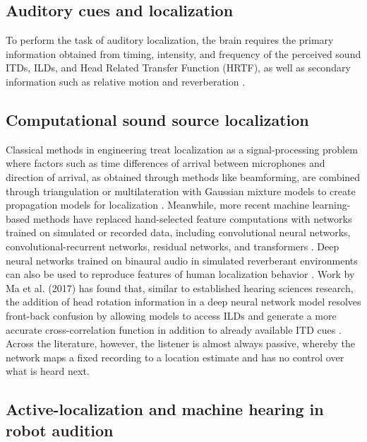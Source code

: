 \documentclass{article}
\begin{document}
\subsection{Auditory cues and localization}
To perform the task of auditory localization, the brain requires the primary information obtained from timing, intensity, and frequency of the perceived sound ITDs, ILDs, and Head Related Transfer Function (HRTF), as well as secondary information such as relative motion and reverberation \cite{carlini2024audiolocalizationsummary}.

\subsection{Computational sound source localization}

Classical methods in engineering treat localization as a signal-processing problem where factors such as time differences of arrival between microphones and direction of arrival, as obtained through methods like beamforming, are combined through triangulation or multilateration with Gaussian mixture models to create propagation models for localization \cite{jekaterynczuk2023survey}. Meanwhile, more recent machine learning-based methods have replaced hand-selected feature computations with networks trained on simulated or recorded data, including convolutional neural networks, convolutional-recurrent networks, residual networks, and transformers \cite{jekaterynczuk2023survey, grumiaux2022survey}. Deep neural networks trained on binaural audio in simulated reverberant environments can also be used to reproduce features of human localization behavior \cite{francl2022deep}. Work by Ma et al. (2017) has found that, similar to established hearing sciences research, the addition of head rotation information in a deep neural network model resolves front-back confusion by allowing models to access ILDs and generate a more accurate cross-correlation function in addition to already available ITD cues \cite{ma2017exploiting}. Across the literature, however, the listener is almost always passive, whereby the network maps a fixed recording to a location estimate and has no control over what is heard next.

\subsection{Active-localization and machine hearing in robot audition}
\end{document}
